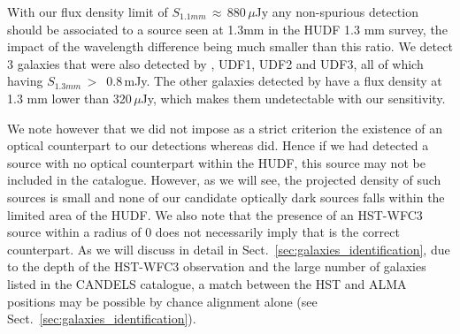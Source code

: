 \documentclass[longauth]{aa}
\begin{document}
With our flux density limit of $S_{1.1mm}$\,$\approx$\,880\,$\mu$Jy any non-spurious detection should be associated to a source seen at 1.3mm in the HUDF 1.3 mm survey, the impact of the wavelength difference being much smaller than this ratio. We detect 3 galaxies that were also detected by \cite{Dunlop2017}, UDF1, UDF2 and UDF3, all of which having $S_{1.3mm}$\,$>$\, 0.8\,mJy. The other galaxies detected by \cite{Dunlop2017} have a flux density at 1.3 mm lower than 320\,$\mu$Jy, which makes them undetectable with our sensitivity. 

We note however that we did not impose as a strict criterion the existence of an optical counterpart to our detections whereas \cite{Dunlop2017} did. Hence if we had detected a source with no optical counterpart within the HUDF, this source may not be included in the \cite{Dunlop2017} catalogue. However, as we will see, the projected density of such sources is small and none of our candidate optically dark sources falls within the limited area of the HUDF. We also note that the presence of an HST-WFC3 source within a radius of 0 does not necessarily imply that is the correct counterpart. As we will discuss in detail in Sect.~\ref{sec:galaxies_identification}, due to the depth of the HST-WFC3 observation and the large number of galaxies listed in the CANDELS catalogue, a match between the HST and ALMA positions may be possible by chance alignment alone (see Sect.~\ref{sec:galaxies_identification}). 
\end{document}

